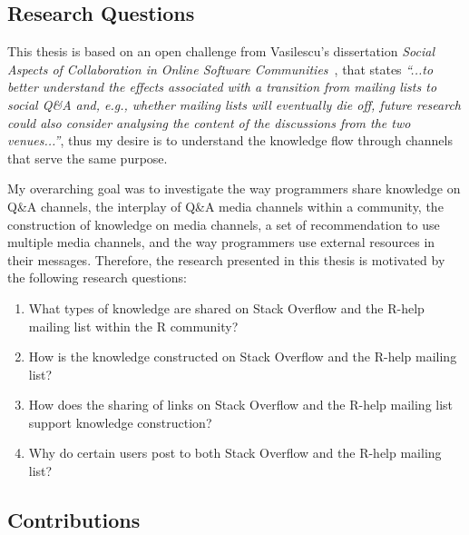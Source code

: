 \documentclass{sig-alternate-05-2015}
\begin{document}
\subsection{Research Questions}

	This thesis is based on an open challenge from Vasilescu's dissertation \textit{Social Aspects of Collaboration in Online Software Communities}~\cite{Vasilescu2014b}, that states \textit{``...to better understand the effects associated with a transition from mailing lists to social Q\&A and, e.g., whether mailing lists will eventually die off, future research could also consider analysing the content of the discussions from the two venues...''}, thus my desire is to understand the knowledge flow through channels that serve the same purpose. 

	My overarching goal was to investigate the way programmers share knowledge on Q\&A channels, the interplay of Q\&A media channels within a community, the construction of knowledge on media channels, a set of recommendation to use multiple media channels, and the way programmers use external resources in their messages.
	Therefore, the research presented in this thesis is motivated by the following research questions:

	\begin{enumerate}[\bfseries RQ-1.]
		\item What types of knowledge are shared on Stack Overflow and the R-help mailing list within the R community?

		\item How is the knowledge constructed on Stack Overflow and the R-help mailing list? 

		\item How does the sharing of links on Stack Overflow and the R-help mailing list support knowledge construction? 

		\item Why do certain users post to both Stack Overflow and the R-help mailing list?

	\end{enumerate}

\subsection{Contributions}
\end{document}
